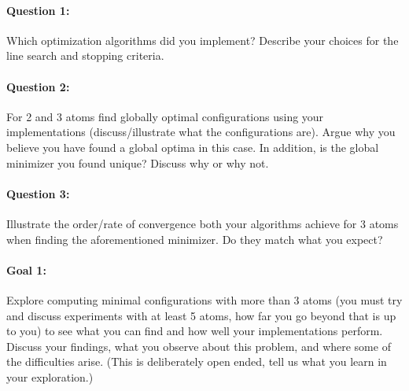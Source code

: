 \documentclass[11pt,onecolumn]{article}
\newcommand{\bluebox}[1]{
  \begin{tcolorbox}[colback=blue!5!white,colframe=blue!75!black,boxrule=0.5pt,boxsep=0pt,left=6pt,right=16pt,top=4pt,bottom=4pt]
  #1
  \end{tcolorbox}   
}
\begin{document}
\bluebox{
\paragraph{Question 1:} Which optimization algorithms did you implement? Describe your choices for the line search and stopping criteria.
}

\bluebox{
\paragraph{Question 2:} For 2 and 3 atoms find globally optimal configurations using your implementations (discuss/illustrate what the configurations are). Argue why you believe you have found a global optima in this case. In addition, is the global minimizer you found unique? Discuss why or why not.
}

\bluebox{
\paragraph{Question 3:} Illustrate the order/rate of convergence both your algorithms achieve for 3 atoms when finding the aforementioned minimizer. Do they match what you expect?
}

\bluebox{
\paragraph{Goal 1:} Explore computing minimal configurations with more than 3 atoms (you must try and discuss experiments with at least 5 atoms, how far you go beyond that is up to you) to see what you can find and how well your implementations perform. Discuss your findings, what you observe about this problem, and where some of the difficulties arise. (This is deliberately open ended, tell us what you learn in your exploration.)
}
\end{document}
